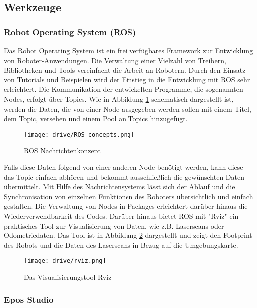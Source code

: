 \subsection{Werkzeuge}

\subsubsection{Robot Operating System (ROS)}

Das Robot Operating System ist ein frei verfügbares Framework zur Entwicklung von Roboter-Anwendungen. Die Verwaltung einer Vielzahl von Treibern, Bibliotheken und Tools vereinfacht die Arbeit an Robotern. Durch den Einsatz von Tutorials und Beispielen wird der Einstieg in die Entwicklung mit ROS sehr erleichtert. Die Kommunikation der entwickelten Programme, die sogenannten Nodes, erfolgt über Topics. Wie in Abbildung \ref{fig:ROS_concepts} schematisch dargestellt ist, werden die Daten, die von einer Node
ausgegeben werden sollen mit einem Titel, dem Topic, versehen und einem Pool an Topics hinzugefügt.

\begin{figure}[h!]
 \centering
		\texttt{[image: drive/ROS\_concepts.png]}
	\caption{ROS Nachrichtenkonzept}
	\label{fig:ROS_concepts}
\end{figure}

Falls diese Daten folgend von einer anderen Node benötigt werden, kann diese das Topic einfach abhören und bekommt ausschließlich die gewünschten Daten übermittelt. Mit Hilfe des Nachrichtensystems lässt sich der Ablauf und die Synchronisation von einzelnen Funktionen des Roboters übersichtlich und einfach gestalten. Die Verwaltung von Nodes in Packages erleichtert darüber hinaus die Wiederverwendbarkeit des Codes. Darüber hinaus bietet ROS mit "Rviz" ein praktisches Tool zur Visualisierung von Daten, wie z.B. Laserscans oder Odometriedaten. Das Tool ist in Abbildung \ref{fig:Rviz} dargestellt und zeigt den Footprint des Robots und die Daten des Laserscans in Bezug auf die Umgebungskarte.

\begin{figure}[h!]
 \centering
		\texttt{[image: drive/rviz.png]}
	\caption{Das Visualisierungstool Rviz}
	\label{fig:Rviz}
\end{figure}

\newpage

\subsubsection{Epos Studio}

